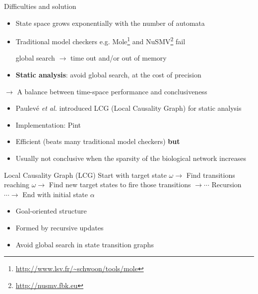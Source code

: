 \documentclass[8pt]{beamer}
\begin{document}
\begin{frame}{Difficulties and solution}
\begin{itemize}
\item State space grows exponentially with the number of automata
\item Traditional model checkers e.g. Mole\footnote{\url{http://www.lsv.fr/~schwoon/tools/mole}} and NuSMV\footnote{\url{http://nusmv.fbk.eu}} fail

global search $\to$ time out and/or out of memory
\item \textbf{Static analysis}: avoid global search, at the cost of precision
\end{itemize}
$\to$ A balance between time-space performance and conclusiveness
\vspace{0.25cm}
\begin{itemize}
    \item Paulev\'e \textit{et al.} introduced LCG (Local Causality Graph) \cite{folschette2015,pauleve2012} for static analysis
    \item Implementation: Pint
\end{itemize}

\begin{itemize}
    \item Efficient (beats many traditional model checkers) \textbf{but}
    \item Usually not conclusive when the sparsity of the biological network increases
\end{itemize}
\end{frame}

\begin{frame}{Local Causality Graph (LCG)}
Start with target state $\omega\to$ Find transitions reaching $\omega\to$ Find new target states to fire those transitions $\to\cdots$ Recursion $\cdots\to$ End with initial state $\alpha$

\begin{itemize}
\item Goal-oriented structure 
\item Formed by recursive updates
\item Avoid global search in state transition graphs
\end{itemize}

\end{frame}
\end{document}
